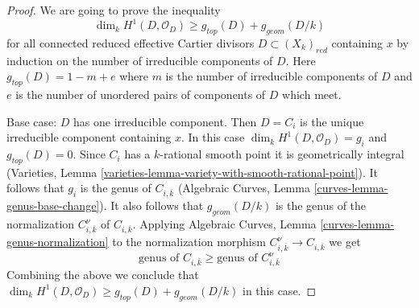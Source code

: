 \begin{proof}

We are going to prove the inequality
$$
\dim_k H^1(D, \mathcal{O}_D) \geq g_{top}(D) + g_{geom}(D/k)
$$
for all connected reduced effective Cartier divisors
$D \subset (X_k)_{red}$ containing $x$ by induction
on the number of irreducible components of $D$.
Here $g_{top}(D) = 1 - m + e$ where $m$ is the number of
irreducible components of $D$ and $e$ is the number of
unordered pairs of components of $D$ which meet.

\medskip\noindent
Base case: $D$ has one irreducible component. Then $D = C_i$
is the unique irreducible component containing $x$.
In this case $\dim_k H^1(D, \mathcal{O}_D) = g_i$
and $g_{top}(D) = 0$. Since $C_i$ has a $k$-rational smooth point
it is geometrically integral
(Varieties, Lemma \ref{varieties-lemma-variety-with-smooth-rational-point}).
It follows that $g_i$ is the genus of $C_{i, \overline{k}}$
(Algebraic Curves, Lemma \ref{curves-lemma-genus-base-change}).
It also follows that $g_{geom}(D/k)$ is the genus of the normalization
$C_{i, \overline{k}}^\nu$ of $C_{i, \overline{k}}$. Applying
Algebraic Curves, Lemma \ref{curves-lemma-genus-normalization}
to the normalization morphism $C_{i, \overline{k}}^\nu \to C_{i, \overline{k}}$
we get
\begin{equation}
\label{equation-genus-change-special-component}
\text{genus of }C_{i, \overline{k}} \geq
\text{genus of }C_{i, \overline{k}}^\nu
\end{equation}
Combining the above we conclude that
$\dim_k H^1(D, \mathcal{O}_D) \geq g_{top}(D) + g_{geom}(D/k)$
in this case.


\end{proof}
